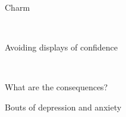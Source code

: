\documentclass[aspectratio=169]{beamer}
\begin{document}
\begin{frame}
  \begin{center}
    \Huge Charm

    \\ \small \cite{clanceimes78}
  \end{center}
\end{frame}

\begin{frame}
  \begin{center}
    \Huge Avoiding displays of confidence

    \\ \small \cite{clanceimes78}
  \end{center}
\end{frame}

\begin{frame}
  \begin{center}
    \Huge What are the consequences?
  \end{center}
\end{frame}

\begin{frame}
  \begin{center}
    \Huge Bouts of depression and anxiety

    \\ \small \cite{hh15}
  \end{center}
\end{frame}
\end{document}
